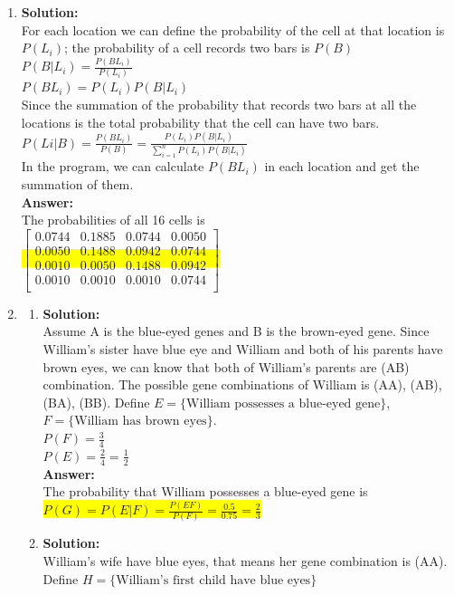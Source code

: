 \documentclass{article}
\newcommand{\myansw}{\textbf{Answer:}\\}
\newcommand{\mysolu}{\textbf{Solution:}\\}
\begin{document}
\begin{enumerate}
	\item
	\mysolu
	For each location we can define the probability of the cell at that location is ${P(L_i)}$; the probability of a cell records two bars is ${P(B)}$\\
	${P(B|L_i)=\frac{P(BL_i)}{P(L_i)}}$\\
	${P(BL_i)=P(L_i)P(B|L_i)}$\\
	Since the summation of the probability that records two bars at all the locations is the total probability that the cell can have two bars.\\
	${P(Li|B)=\frac{P(BL_i)}{P(B)}=\frac{P(L_i)P(B|L_i)}{\sum\limits_{i=1}^n P(L_i)P(B|L_i)}}$\\
	In the program, we can calculate ${P(BL_i)}$ in each location and get the summation of them.\\
	\myansw
	The probabilities of all 16 cells is\\
	\colorbox{yellow}{
		$\begin{bmatrix}
			0.0744&0.1885&0.0744&0.0050\\
			0.0050&0.1488&0.0942&0.0744\\
			0.0010&0.0050&0.1488&0.0942\\
			0.0010&0.0010&0.0010&0.0744\\
		\end{bmatrix}$
	}
	\item
	\begin{enumerate}
		\item
		\mysolu
		Assume A is the blue-eyed genes and B is the brown-eyed gene. Since William's sister have blue eye and William and both of his parents have brown eyes, we can know that both of William's parents are (AB) combination.
		The possible gene combinations of William is (AA), (AB), (BA), (BB). Define ${E = \{\text{William possesses a blue-eyed gene}\}}$, ${F = \{\text{William has brown eyes}\}}$.\\
		${P(F) = \frac{3}{4}}$\\
		${P(E)= \frac{2}{4} = \frac{1}{2}}$\\
		\myansw
		The probability that William possesses a blue-eyed gene is\\
		\colorbox{yellow}{${P(G)=P(E|F)=\frac{P(EF)}{P(F)}=\frac{0.5}{0.75}=\frac{2}{3}}$}\\
		\item
		\mysolu
		William's wife have blue eyes, that means her gene combination is (AA).\\
		Define ${H = \{\text{William's first child have blue eyes}\}}$\\

\end{enumerate}
\end{enumerate}
\end{document}
